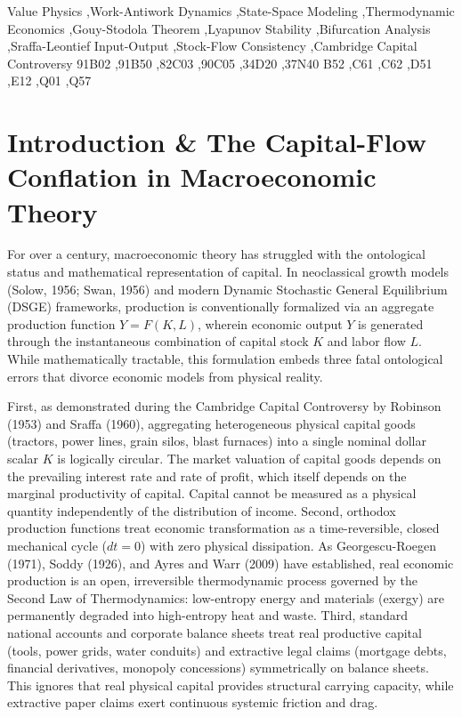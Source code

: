 \documentclass[preprint,12pt,authoryear]{elsarticle}
\theoremstyle{definition}
\begin{document}
\begin{frontmatter}
\begin{abstract}
\end{abstract}

\begin{keyword}
Value Physics \sep Work-Antiwork Dynamics \sep State-Space Modeling \sep Thermodynamic Economics \sep Gouy-Stodola Theorem \sep Lyapunov Stability \sep Bifurcation Analysis \sep Sraffa-Leontief Input-Output \sep Stock-Flow Consistency \sep Cambridge Capital Controversy
\MSC[2020] 91B02 \sep 91B50 \sep 82C03 \sep 90C05 \sep 34D20 \sep 37N40
\JEL B52 \sep C61 \sep C62 \sep D51 \sep E12 \sep Q01 \sep Q57
\end{keyword}

\end{frontmatter}

\section{Introduction \& The Capital-Flow Conflation in Macroeconomic Theory}



  
  



For over a century, macroeconomic theory has struggled with the ontological status and mathematical representation of capital. In neoclassical growth models (Solow, 1956; Swan, 1956) and modern Dynamic Stochastic General Equilibrium (DSGE) frameworks, production is conventionally formalized via an aggregate production function $Y = F(K, L)$, wherein economic output $Y$ is generated through the instantaneous combination of capital stock $K$ and labor flow $L$. While mathematically tractable, this formulation embeds three fatal ontological errors that divorce economic models from physical reality.

First, as demonstrated during the Cambridge Capital Controversy by Robinson (1953) and Sraffa (1960), aggregating heterogeneous physical capital goods (tractors, power lines, grain silos, blast furnaces) into a single nominal dollar scalar $K$ is logically circular. The market valuation of capital goods depends on the prevailing interest rate and rate of profit, which itself depends on the marginal productivity of capital. Capital cannot be measured as a physical quantity independently of the distribution of income. Second, orthodox production functions treat economic transformation as a time-reversible, closed mechanical cycle ($dt = 0$) with zero physical dissipation. As Georgescu-Roegen (1971), Soddy (1926), and Ayres and Warr (2009) have established, real economic production is an open, irreversible thermodynamic process governed by the Second Law of Thermodynamics: low-entropy energy and materials (exergy) are permanently degraded into high-entropy heat and waste. Third, standard national accounts and corporate balance sheets treat real productive capital (tools, power grids, water conduits) and extractive legal claims (mortgage debts, financial derivatives, monopoly concessions) symmetrically on balance sheets. This ignores that real physical capital provides structural carrying capacity, while extractive paper claims exert continuous systemic friction and drag.
\end{document}
